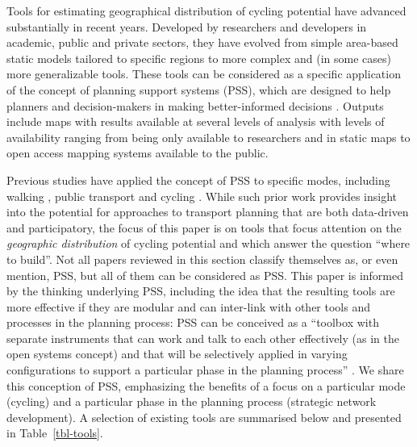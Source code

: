 \documentclass[
  super,
  preprint,
  3p]{elsarticle}
\begin{document}
Tools for estimating geographical distribution of cycling potential have
advanced substantially in recent years. Developed by researchers and
developers in academic, public and private sectors, they have evolved
from simple area-based static models tailored to specific regions to
more complex and (in some cases) more generalizable tools. These tools
can be considered as a specific application of the concept of planning
support systems (PSS), which are designed to help planners and
decision-makers in making better-informed decisions
\citep{geertman2009}. Outputs include maps with results available at
several levels of analysis with levels of availability ranging from
being only available to researchers and in static maps to open access
mapping systems available to the public.

Previous studies have applied the concept of PSS to specific modes,
including walking \citep{bencekri2024}, public transport
\citep{barmentlo2012} and cycling \citep{bencekri2023}. While such prior
work provides insight into the potential for approaches to transport
planning that are both data-driven and participatory, the focus of this
paper is on tools that focus attention on the \emph{geographic
distribution} of cycling potential and which answer the question ``where
to build''. Not all papers reviewed in this section classify themselves
as, or even mention, PSS, but all of them can be considered as PSS. This
paper is informed by the thinking underlying PSS, including the idea
that the resulting tools are more effective if they are modular and can
inter-link with other tools and processes in the planning process: PSS
can be conceived as a ``toolbox with separate instruments that can work
and talk to each other effectively (as in the open systems concept) and
that will be selectively applied in varying configurations to support a
particular phase in the planning process'' \citep{geertman2002}. We
share this conception of PSS, emphasizing the benefits of a focus on a
particular mode (cycling) and a particular phase in the planning process
(strategic network development). A selection of existing tools are
summarised below and presented in Table~\ref{tbl-tools}.

\newpage
\end{document}
